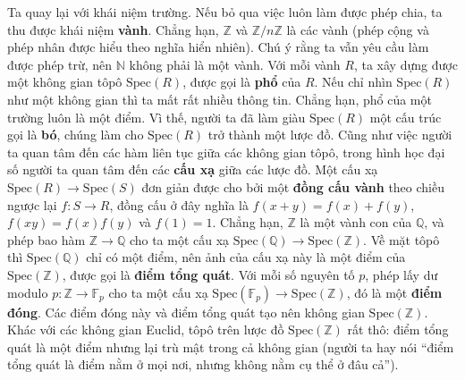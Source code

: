 \begin{multicols}{2}
	\vskip 0.1cm
	Ta quay lại với khái niệm trường. Nếu bỏ qua việc luôn làm được phép chia, ta thu được khái niệm {\bf\color{duongvaotoanhoc} vành}. Chẳng hạn, $\mathbb{Z}$ và $\mathbb{Z}/n\mathbb{Z}$ là các vành (phép cộng và phép nhân được hiểu theo nghĩa hiển nhiên). Chú ý rằng ta vẫn yêu cầu làm được phép trừ, nên $\mathbb{N}$ không phải là một vành. Với mỗi vành $R$, ta xây dựng được một không gian tôpô $\text{Spec}(R)$, được gọi là {\bf\color{duongvaotoanhoc} phổ} của $R$. Nếu chỉ nhìn $\text{Spec}(R)$ như một không gian thì ta mất rất nhiều thông tin. Chẳng hạn, phổ của một trường luôn là một điểm. Vì thế, người ta đã làm giàu $\text{Spec}(R)$ một cấu trúc gọi là {\bf\color{duongvaotoanhoc} bó}, chúng làm cho $\text{Spec}(R)$ trở thành một lược đồ.
	\vskip 0.1cm
	Cũng như việc người ta quan tâm đến các hàm liên tục giữa các không gian tôpô, trong hình học đại số người ta quan tâm đến các {\bf\color{duongvaotoanhoc} cấu xạ} giữa các lược đồ. Một cấu xạ $\text{Spec}(R) \to \text{Spec}(S)$ đơn giản được cho bởi một {\bf\color{duongvaotoanhoc} đồng cấu vành} theo chiều ngược lại $f: S \to R$, đồng cấu ở đây nghĩa là $f(x+y) = f(x)+f(y)$, $f(xy) = f(x)f(y)$ và $f(1) = 1$. Chẳng hạn, $\mathbb{Z}$ là một vành con của $\mathbb{Q}$, và phép bao hàm $\mathbb{Z} \to \mathbb{Q}$ cho ta một cấu xạ $\text{Spec}(\mathbb{Q}) \to \text{Spec}(\mathbb{Z})$. Về mặt tôpô thì $\text{Spec}(\mathbb{Q})$ chỉ có một điểm, nên ảnh của cấu xạ này là một điểm của $\text{Spec}(\mathbb{Z})$, được gọi là {\bf\color{duongvaotoanhoc} điểm tổng quát}. Với mỗi số nguyên tố $p$, phép lấy dư modulo $p: \mathbb{Z} \to \mathbb{F}_p$ cho ta một cấu xạ $\text{Spec}(\mathbb{F}_p) \to \text{Spec}(\mathbb{Z})$, đó là một {\bf\color{duongvaotoanhoc} điểm đóng}. Các điểm đóng này và điểm tổng quát tạo nên không gian $\text{Spec}(\mathbb{Z})$. Khác với các không gian Euclid, tôpô trên lược đồ $\text{Spec}(\mathbb{Z})$ rất thô: điểm tổng quát là một điểm nhưng lại trù mật trong cả không gian (người ta hay nói ``điểm tổng quát là điểm nằm ở mọi nơi, nhưng không nằm cụ thể ở đâu cả'').
	\vskip 0.1cm

\end{multicols}
